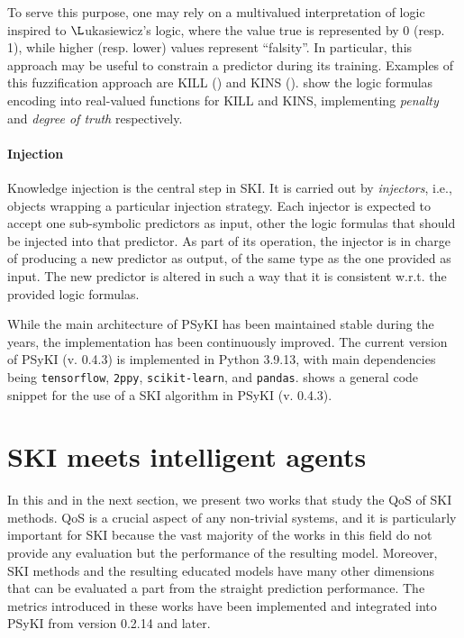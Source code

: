 To serve this purpose, one may rely on a multivalued interpretation of logic inspired to $\L$ukasiewicz's logic, where the value true is represented by 0 (resp. 1), while higher (resp. lower) values represent ``falsity''.
%
In particular, this approach may be useful to constrain a predictor during its training.
%
Examples of this fuzzification approach are \gls{KILL} () and \gls{KINS} ().
%
 show the logic formulas encoding into real-valued functions for \gls{KILL} and \gls{KINS}, implementing \emph{penalty} and \emph{degree of truth} respectively.


\paragraph{Injection}\label{par:injection}
%

%
Knowledge injection is the central step in \gls{SKI}.
%
It is carried out by \emph{injectors}, i.e., objects wrapping a particular injection strategy.
%
Each injector is expected to accept one sub-symbolic predictors as input, other the logic formulas that should be injected into that predictor.
%
As part of its operation, the injector is in charge of producing a new predictor as output, of the same type as the one provided as input.
%
The new predictor is altered in such a way that it is consistent w.r.t. the provided logic formulas.


While the main architecture of \gls{PSyKI} has been maintained stable during the years, the implementation has been continuously improved.
%
The current version of \gls{PSyKI} (v. 0.4.3) is implemented in Python 3.9.13, with main dependencies being \texttt{tensorflow}, \texttt{2ppy}, \texttt{scikit-learn}, and \texttt{pandas}.
%
 shows a general code snippet for the use of a \gls{SKI} algorithm in \gls{PSyKI} (v. 0.4.3).


\section[SKI meets intelligent agents]{\Gls{SKI} meets intelligent agents}\label{sec:ski-meets-intelligent-agents}
%
In this and in the next section, we present two works that study the \gls{QoS} of \gls{SKI} methods.
%
\Gls{QoS} is a crucial aspect of any non-trivial systems, and it is particularly important for \gls{SKI} because the vast majority of the works in this field do not provide any evaluation but the performance of the resulting model.
%
Moreover, \gls{SKI} methods and the resulting educated models have many other dimensions that can be evaluated a part from the straight prediction performance.
%
The metrics introduced in these works have been implemented and integrated into \gls{PSyKI} from version 0.2.14 and later.


